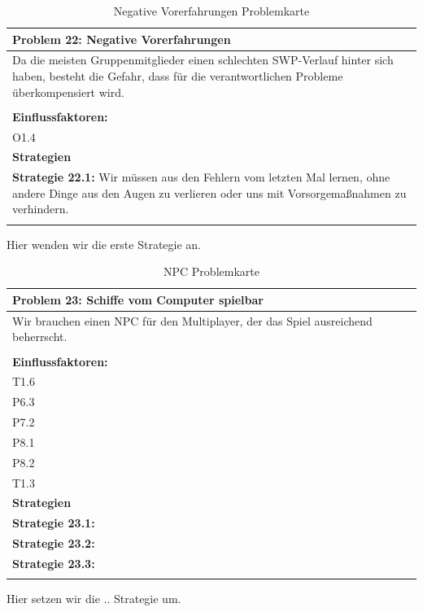 \documentclass[fontsize=12pt,paper=a4,twoside]{scrartcl}
\begin{document}
\begin{table}[H]
    \centering
    \begin{tabular}{|p{15cm}|}
    \hline
          \textbf{Problem 22: Negative Vorerfahrungen}  \\ \hline
	Da die meisten Gruppenmitglieder einen schlechten SWP-Verlauf hinter sich haben, besteht die Gefahr, dass für die verantwortlichen Probleme überkompensiert wird. \\
         \\ \hline
          \textbf{Einflussfaktoren: } \\
	O1.4 \\
          \hline
          \textbf{Strategien} \\ \hline
            {}          
           \label{strategie:22.1}     
          \textbf{Strategie 22.1: } Wir müssen aus den Fehlern vom letzten Mal lernen, ohne andere Dinge aus den Augen zu verlieren oder uns mit Vorsorgemaßnahmen zu verhindern.  \\     
	 \\ \hline
    \end{tabular}

    \caption{Negative Vorerfahrungen Problemkarte}
    \label{tab:ProblemKarte22}
\end{table}
Hier wenden wir die erste Strategie an. \\

\begin{table}[H]
    \centering
    \begin{tabular}{|p{15cm}|}
    \hline
          \textbf{Problem 23: Schiffe vom Computer spielbar}  \\ \hline
	Wir brauchen einen NPC für den Multiplayer, der das Spiel ausreichend beherrscht. \\
         \\ \hline
          \textbf{Einflussfaktoren: } \\
	T1.6 \\
	P6.3 \\
	P7.2 \\
	P8.1 \\
	P8.2 \\
	T1.3 \\
          \hline
          \textbf{Strategien} \\ \hline
            {}          
           \label{strategie:23.1}     
          \textbf{Strategie 23.1:}  \\        
  {}          
           \label{strategie:23.2}              
          \textbf{Strategie 23.2:}  \\
	 {}          
           \label{strategie:23.3}     
          \textbf{Strategie 23.3: }  \\ 
	 \\ \hline
    \end{tabular}

    \caption{NPC Problemkarte}
    \label{tab:ProblemKarte23}
\end{table}
Hier setzen wir die .. Strategie um. \\
\end{document}
